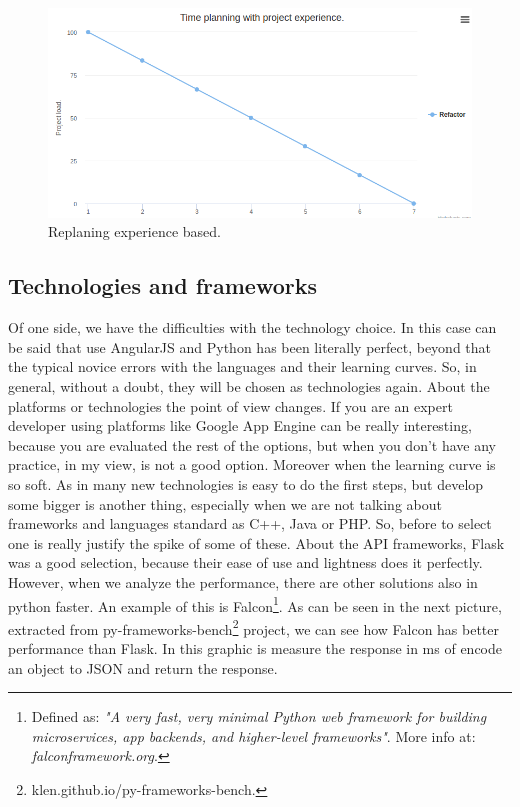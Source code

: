 \begin{figure}[H]
  \includegraphics[scale=0.4]{img/graphics/redo.png}
  \centering
  \caption{Replaning experience based.}
\end{figure}

\subsection{Technologies and frameworks}

Of one side, we have the difficulties with the technology choice. In this case
can be said that use AngularJS and Python has been literally perfect, beyond
that the typical novice errors with the languages and their learning curves.
So, in general, without a doubt, they will be chosen as technologies again.
\intro
About the platforms or technologies the point of view changes. If you are
an expert developer using platforms like Google App Engine can be really
interesting, because you are evaluated the rest of the options, but when
you don't have any practice, in my view, is not a good option. Moreover when
the learning curve is so soft.
\intro
As in many new technologies is easy to do the first steps, but develop some bigger
is another thing, especially when we are not talking about frameworks and
languages standard as C++, Java or PHP. So, before to select one is really justify
the spike of some of these.
\intro
About the API frameworks, Flask was a good selection, because their ease of use
and lightness does it perfectly. However, when we analyze the performance, there are
other solutions also in python faster. An example of this is Falcon\footnote{Defined as: \textit{"A
very fast, very minimal Python web framework for building microservices, app backends,
and higher-level frameworks"}. More info at: \textit{falconframework.org}.}. As can be
seen in the next picture, extracted from py-frameworks-bench\footnote{
klen.github.io/py-frameworks-bench.} project, we can see how Falcon has
better performance than Flask. In this graphic is measure the response in ms
of encode an object to JSON and return the response.

